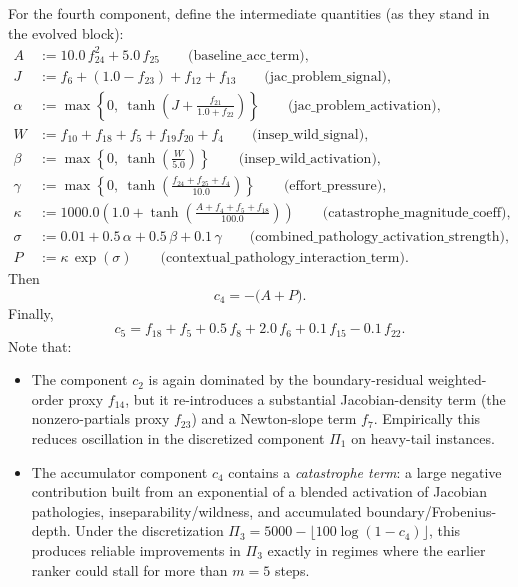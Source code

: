\documentclass[11pt]{amsart}
\begin{document}
For the fourth component, define the intermediate quantities (as they stand in the evolved block):
\[
\begin{aligned}
A &:= 10.0\,f_{24}^{2}+5.0\,f_{25}
\qquad\text{(baseline\_acc\_term)},\\[4pt]
J &:= f_{6}+(1.0-f_{23})+f_{12}+f_{13}
\qquad\text{(jac\_problem\_signal)},\\[4pt]
\alpha &:= \max\!\left\{0,\ \tanh\!\left(J+\frac{f_{21}}{1.0+f_{22}}\right)\right\}
\qquad\text{(jac\_problem\_activation)},\\[6pt]
W &:= f_{10}+f_{18}+f_{5}+f_{19}f_{20}+f_{4}
\qquad\text{(insep\_wild\_signal)},\\[4pt]
\beta &:= \max\!\left\{0,\ \tanh\!\left(\frac{W}{5.0}\right)\right\}
\qquad\text{(insep\_wild\_activation)},\\[6pt]
\gamma &:= \max\!\left\{0,\ \tanh\!\left(\frac{f_{24}+f_{25}+f_{4}}{10.0}\right)\right\}
\qquad\text{(effort\_pressure)},\\[6pt]
\kappa &:= 1000.0\left(1.0+\tanh\!\left(\frac{A+f_{4}+f_{5}+f_{18}}{100.0}\right)\right)
\qquad\text{(catastrophe\_magnitude\_coeff)},\\[6pt]
\sigma &:= 0.01+0.5\,\alpha+0.5\,\beta+0.1\,\gamma
\qquad\text{(combined\_pathology\_activation\_strength)},\\[6pt]
P &:= \kappa\,\exp(\sigma)
\qquad\text{(contextual\_pathology\_interaction\_term)}.
\end{aligned}
\]
Then
\[
c_4 = -\bigl(A+P\bigr).
\]
Finally,
\[
c_5 = f_{18}+f_{5}+0.5\,f_{8}+2.0\,f_{6}+0.1\,f_{15}-0.1\,f_{22}.
\]
Note that:
\begin{itemize}[leftmargin=*]
\item The component $c_2$ is again dominated by the boundary-residual weighted-order proxy $f_{14}$,
but it re-introduces a substantial Jacobian-density term (the nonzero-partials proxy $f_{23}$) and a Newton-slope term
$f_7$. Empirically this reduces oscillation in the discretized component $\Pi_1$ on heavy-tail instances.

\item The accumulator component $c_4$ contains a \emph{catastrophe term}:
a large negative contribution built from an exponential of a blended activation of Jacobian pathologies,
inseparability/wildness, and accumulated boundary/Frobenius-depth.
Under the discretization $\Pi_3 = 5000 - \lfloor 100\log(1-\!c_4)\rfloor$, this produces reliable improvements in
$\Pi_3$ exactly in regimes where the earlier ranker could stall for more than $m=5$ steps.
\end{itemize}
\end{document}
